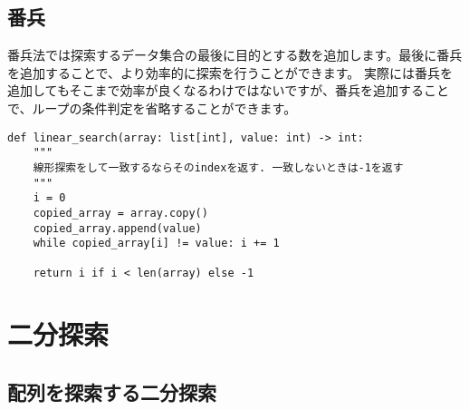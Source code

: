 \subsection{番兵}

番兵法では探索するデータ集合の最後に目的とする数を追加します。最後に番兵を追加することで、より効率的に探索を行うことができます。
実際には番兵を追加してもそこまで効率が良くなるわけではないですが、番兵を追加することで、ループの条件判定を省略することができます。

\vspace{0.5cm}

\begin{center}
\end{center}

\begin{lstlisting}[caption=番兵の実装, frame=TRBL, label={sentinel}]
def linear_search(array: list[int], value: int) -> int:
    """
    線形探索をして一致するならそのindexを返す. 一致しないときは-1を返す
    """
    i = 0
    copied_array = array.copy()
    copied_array.append(value)
    while copied_array[i] != value: i += 1
    
    return i if i < len(array) else -1
  \end{lstlisting}

\section{二分探索}

\subsection{配列を探索する二分探索}

